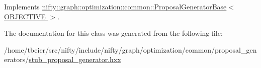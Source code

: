 Implements \hyperlink{classnifty_1_1graph_1_1optimization_1_1common_1_1ProposalGeneratorBase_a5751b664edd5f19a0232b3d6527a4135}{nifty\+::graph\+::optimization\+::common\+::\+Proposal\+Generator\+Base$<$ O\+B\+J\+E\+C\+T\+I\+V\+E $>$}.



The documentation for this class was generated from the following file\+:\begin{DoxyCompactItemize}
\item 
/home/tbeier/src/nifty/include/nifty/graph/optimization/common/proposal\+\_\+generators/\hyperlink{stub__proposal__generator_8hxx}{stub\+\_\+proposal\+\_\+generator.\+hxx}\end{DoxyCompactItemize}
